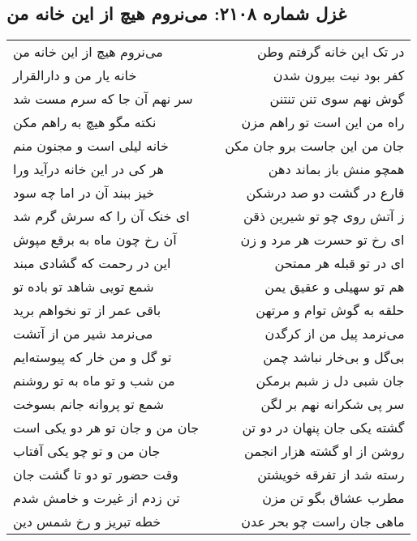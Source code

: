 \begin{center}
\section*{غزل شماره ۲۱۰۸: می‌نروم هیچ از این خانه من}
\label{sec:2108}
\begin{longtable}{l p{0.5cm} r}
می‌نروم هیچ از این خانه من
&&
در تک این خانه گرفتم وطن
\\
خانه یار من و دارالقرار
&&
کفر بود نیت بیرون شدن
\\
سر نهم آن جا که سرم مست شد
&&
گوش نهم سوی تنن تنتنن
\\
نکته مگو هیچ به راهم مکن
&&
راه من این است تو راهم مزن
\\
خانه لیلی است و مجنون منم
&&
جان من این جاست برو جان مکن
\\
هر کی در این خانه درآید ورا
&&
همچو منش باز بماند دهن
\\
خیز ببند آن در اما چه سود
&&
قارع در گشت دو صد درشکن
\\
ای خنک آن را که سرش گرم شد
&&
ز آتش روی چو تو شیرین ذقن
\\
آن رخ چون ماه به برقع مپوش
&&
ای رخ تو حسرت هر مرد و زن
\\
این در رحمت که گشادی مبند
&&
ای در تو قبله هر ممتحن
\\
شمع تویی شاهد تو باده تو
&&
هم تو سهیلی و عقیق یمن
\\
باقی عمر از تو نخواهم برید
&&
حلقه به گوش توام و مرتهن
\\
می‌نرمد شیر من از آتشت
&&
می‌نرمد پیل من از کرگدن
\\
تو گل و من خار که پیوسته‌ایم
&&
بی‌گل و بی‌خار نباشد چمن
\\
من شب و تو ماه به تو روشنم
&&
جان شبی دل ز شبم برمکن
\\
شمع تو پروانه جانم بسوخت
&&
سر پی شکرانه نهم بر لگن
\\
جان من و جان تو هر دو یکی است
&&
گشته یکی جان پنهان در دو تن
\\
جان من و تو چو یکی آفتاب
&&
روشن از او گشته هزار انجمن
\\
وقت حضور تو دو تا گشت جان
&&
رسته شد از تفرقه خویشتن
\\
تن زدم از غیرت و خامش شدم
&&
مطرب عشاق بگو تن مزن
\\
خطه تبریز و رخ شمس دین
&&
ماهی جان راست چو بحر عدن
\\
\end{longtable}
\end{center}
